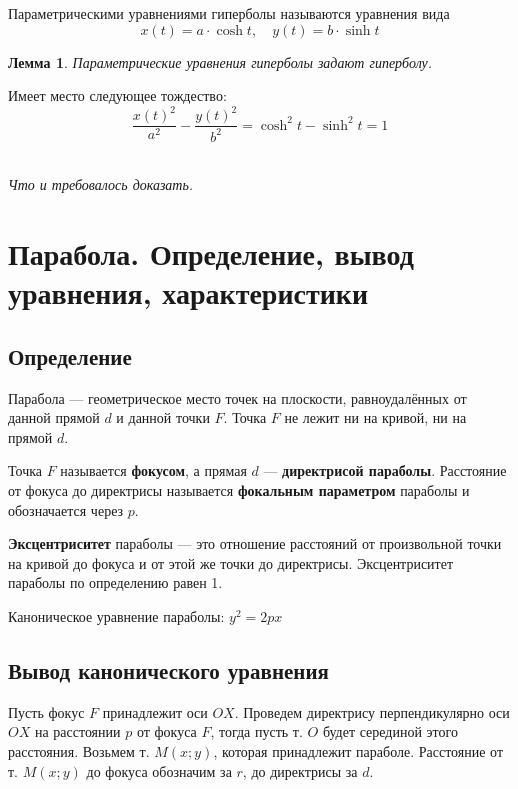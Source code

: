 \documentclass[a4paper,12pt,oneside]{extbook}
\newcommand{\newpar}{$ $\par\nobreak\ignorespaces}
\theoremstyle{numbered}
\theoremstyle{unnumbered}
\theoremstyle{named}
\theoremstyle{unnumbered}
\theoremstyle{named}
\newtheorem{lemma}{Лемма}[section]
\theoremstyle{named}
\theoremstyle{named}
\renewenvironment{proof}[1][]{\breakenv[Доказательство]{\if\relax\detokenize{#1}\relax\else\;\fi}{\textbf{#1}}}{\smallskip\newpar \hfill\textit{Что и требовалось доказать.}}
\begin{document}
\begin{siderules}
    Параметрическими уравнениями гиперболы называются уравнения вида
    \[
        x(t) = a \cdot \cosh{t}, \quad y(t) = b \cdot \sinh{t}
    \]
\end{siderules}

\begin{lemma}
    Параметрические уравнения гиперболы задают гиперболу.
\end{lemma}

\begin{proof}
    Имеет место следующее тождество:
    \[
        \frac{x(t)^2}{a^2} - \frac{y(t)^2}{b^2} = \cosh^2{t} - \sinh^2{t} = 1
    \]
\end{proof}

\section{Парабола. Определение, вывод уравнения, характеристики}
\label{sec:parabola}

\subsection{Определение}
Парабола — геометрическое место точек на плоскости, равноудалённых от данной прямой \(d\) и данной точки \(F\).
Точка \(F\) не лежит ни на кривой, ни на прямой \(d\).

Точка \(F\) называется \textbf{фокусом}, а прямая \(d\) — \textbf{директрисой параболы}.
Расстояние от фокуса до директрисы называется \textbf{фокальным параметром} параболы и обозначается через \(p\).

\textbf{Эксцентриситет} параболы — это отношение расстояний от произвольной точки на кривой до фокуса и от этой же точки до директрисы.
Эксцентриситет параболы по определению равен 1.

Каноническое уравнение параболы: \(y^2 = 2px\)

\subsection{Вывод канонического уравнения}

Пусть фокус \(F\) принадлежит оси \(OX\).
Проведем директрису перпендикулярно оси \(OX\) на расстоянии \(p\) от фокуса \(F\), тогда пусть т. \(O\) будет серединой этого расстояния.
Возьмем т. \(M(x; y)\), которая принадлежит параболе.
Расстояние от т. \(M(x; y)\) до фокуса обозначим за \(r\), до директрисы за \(d\).
\end{document}
